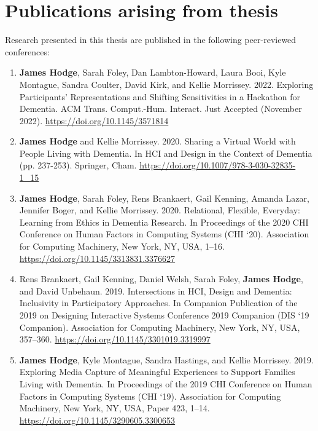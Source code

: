 \chapter{Publications arising from thesis}
\label{Publications}
Research presented in this thesis are published in the following peer-reviewed conferences:

\begin{enumerate}

    \item \textbf{James Hodge}, Sarah Foley, Dan Lambton-Howard, Laura Booi, Kyle Montague, Sandra Coulter, David Kirk, and Kellie Morrissey. 2022. Exploring Participants’ Representations and Shifting Sensitivities in a Hackathon for Dementia. ACM Trans. Comput.-Hum. Interact. Just Accepted (November 2022). \href{https://doi.org/10.1145/3571814}{https://doi.org/10.1145/3571814}

    \item \textbf{James Hodge} and Kellie Morrissey. 2020. Sharing a Virtual World with People Living with Dementia. In HCI and Design in the Context of Dementia (pp. 237-253). Springer, Cham. \href{https://doi.org/10.1007/978-3-030-32835-1\_15}{https://doi.org/10.1007/978-3-030-32835-1\_15}

    \item \textbf{James Hodge}, Sarah Foley, Rens Brankaert, Gail Kenning, Amanda Lazar, Jennifer Boger, and Kellie Morrissey. 2020. Relational, Flexible, Everyday: Learning from Ethics in Dementia Research. In Proceedings of the 2020 CHI Conference on Human Factors in Computing Systems (CHI `20). Association for Computing Machinery, New York, NY, USA, 1–16. \href{https://doi.org/10.1145/3313831.3376627}{https://doi.org/10.1145/3313831.3376627}

    \item Rens Brankaert, Gail Kenning, Daniel Welsh, Sarah Foley, \textbf{James Hodge}, and David Unbehaun. 2019. Intersections in HCI, Design and Dementia: Inclusivity in Participatory Approaches. In Companion Publication of the 2019 on Designing Interactive Systems Conference 2019 Companion (DIS `19 Companion). Association for Computing Machinery, New York, NY, USA, 357–360. \href{https://doi.org/10.1145/3301019.3319997}{https://doi.org/10.1145/3301019.3319997}

    \item \textbf{James Hodge}, Kyle Montague, Sandra Hastings, and Kellie Morrissey. 2019. Exploring Media Capture of Meaningful Experiences to Support Families Living with Dementia. In Proceedings of the 2019 CHI Conference on Human Factors in Computing Systems (CHI `19). Association for Computing Machinery, New York, NY, USA, Paper 423, 1–14. \href{https://doi.org/10.1145/3290605.3300653}{https://doi.org/10.1145/3290605.3300653}


\end{enumerate}
